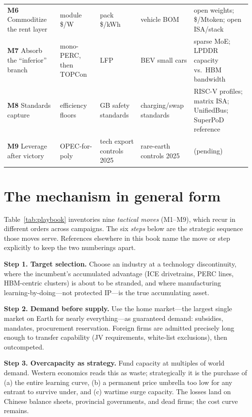 \begin{table}[htbp]
\begin{tabular}{p{28mm}p{25mm}p{25mm}p{25mm}p{34mm}}
    \addlinespace
    \textbf{M6} Commoditize the rent layer & module \$/W & pack \$/kWh & vehicle BOM & open weights; \$/Mtoken; open ISA/stack \\
    \addlinespace
    \textbf{M7} Absorb the ``inferior'' branch & mono-PERC, then TOPCon & LFP & BEV small cars & sparse MoE; LPDDR capacity vs.\ HBM bandwidth \\
    \addlinespace
    \textbf{M8} Standards capture & efficiency floors & GB safety standards & charging/swap standards & RISC-V profiles; matrix ISA; UnifiedBus; SuperPoD reference \\
    \addlinespace
    \textbf{M9} Leverage after victory & OPEC-for-poly & tech export controls 2025 & rare-earth controls 2025 & (pending) \\
    \bottomrule
  \end{tabular}
\end{table}

\section{The mechanism in general form}

\noindent Table~\ref{tab:playbook} inventories nine \emph{tactical moves} (M1--M9), which recur in different orders across campaigns. The six \emph{steps} below are the strategic sequence those moves serve. References elsewhere in this book name the move or step explicitly to keep the two numberings apart.

\textbf{Step 1. Target selection.} Choose an industry at a technology discontinuity, where the incumbent's accumulated advantage (ICE drivetrains, PERC lines, HBM-centric clusters) is about to be stranded, and where manufacturing learning-by-doing---not protected IP---is the true accumulating asset.

\textbf{Step 2. Demand before supply.} Use the home market---the largest single market on Earth for nearly everything---as guaranteed demand: subsidies, mandates, procurement reservation. Foreign firms are admitted precisely long enough to transfer capability (JV requirements, white-list exclusions), then outcompeted.

\textbf{Step 3. Overcapacity as strategy.} Fund capacity at multiples of world demand. Western economics reads this as waste; strategically it is the purchase of (a) the entire learning curve, (b) a permanent price umbrella too low for any entrant to survive under, and (c) wartime surge capacity. The losses land on Chinese balance sheets, provincial governments, and dead firms; the cost curve remains.

